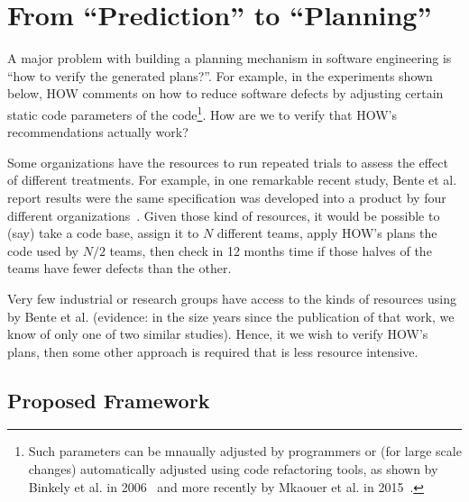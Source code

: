 \documentclass[conference]{IEEEtran}
\begin{document}
 

\section{From ``Prediction'' to ``Planning''}
A major  problem with building a planning mechanism in software engineering is ``how to verify the generated
plans?''. For example,  in the experiments shown below,  HOW comments  on how to reduce
software defects by adjusting certain static code parameters of the code\footnote{Such parameters can be mnaually adjusted by programmers or (for large scale changes) automatically adjusted using code refactoring
tools, as shown by Binkely et al. in 2006~\cite{Binkley2006} and more recently by Mkaouer et al. in 2015~\cite{Mkaouer15}.}. How are we to verify that HOW's recommendations actually work? 

Some organizations have the resources to 
run repeated trials to assess the effect of different treatments.
For example, in one remarkable recent study, Bente et al. report results
were the same specification was developed into a product by four different organizations~\cite{Anda2009}. Given those kind of resources, it would be possible
to (say) take a code base, assign it to $N$ different teams, apply
HOW's plans the code used by  $N/2$ teams, then check in 12 months time
if those halves of the teams have fewer defects than the other.  

Very few industrial or research groups have access
to the kinds of resources using by Bente et al. (evidence: in the size years since the
publication of that work, we know of only one of two similar studies). Hence, it
we wish to verify HOW's plans, then some other approach is required that is less
resource intensive.

\subsection{Proposed Framework}
\end{document}
